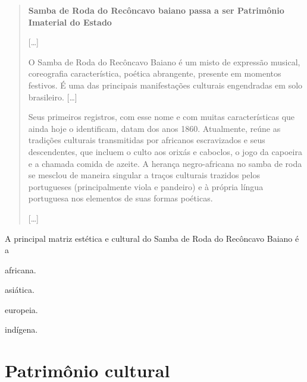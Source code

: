 \begin{quote}
\textbf{Samba de Roda do Recôncavo baiano passa a ser Patrimônio Imaterial do Estado}

{[}\ldots{}{]}

O Samba de Roda do Recôncavo Baiano é um misto de expressão musical,
coreografia característica, poética abrangente, presente em momentos
festivos. É uma das principais manifestações culturais engendradas em
solo brasileiro. {[}\ldots{}{]}

Seus primeiros registros, com esse nome e com muitas características que
ainda hoje o identificam, datam dos anos 1860. Atualmente, reúne as
tradições culturais transmitidas por africanos escravizados e seus
descendentes, que incluem o culto aos orixás e caboclos, o jogo da
capoeira e a chamada comida de azeite. A herança negro-africana no samba
de roda se mesclou de maneira singular a traços culturais trazidos pelos
portugueses (principalmente viola e pandeiro) e à própria língua
portuguesa nos elementos de suas formas poéticas.

{[}\ldots{}{]}

\end{quote}

A principal matriz estética e cultural do Samba de Roda do Recôncavo Baiano é a

\begin{minipage}{.5\textwidth}
\begin{escolha}
\item
  africana.
\item
  asiática.
\item
  europeia.
\item
  indígena.
\end{escolha}
\end{minipage}

\chapter{Patrimônio cultural}

